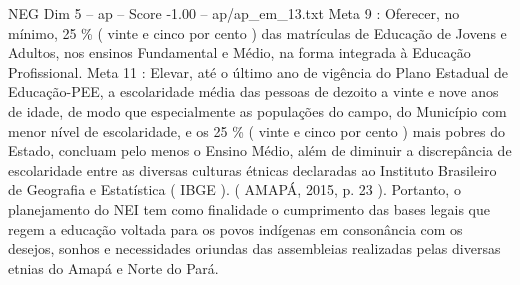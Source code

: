\begin{textsample}{NEG Dim 5 – ap – Score -1.00 – ap/ap\_em\_13.txt}
Meta 9 : Oferecer, no mínimo, 25 \% ( vinte e cinco por cento ) das matrículas de Educação de Jovens e Adultos, nos ensinos Fundamental e Médio, na forma integrada à Educação Profissional.
Meta 11 : Elevar, até o último ano de vigência do Plano Estadual de Educação-PEE, a escolaridade média das pessoas de dezoito a vinte e nove anos de idade, de modo que especialmente as populações do campo, do Município com menor nível de escolaridade, e os 25 \% ( vinte e cinco por cento ) mais pobres do Estado, concluam pelo menos o Ensino Médio, além de diminuir a discrepância de escolaridade entre as diversas culturas étnicas declaradas ao Instituto Brasileiro de Geografia e Estatística ( IBGE ). ( AMAPÁ, 2015, p. 23 ).
Portanto, o planejamento do NEI tem como finalidade o cumprimento das bases legais que regem a educação voltada para os povos indígenas em consonância com os desejos, sonhos e necessidades oriundas das assembleias realizadas pelas diversas etnias do Amapá e Norte do Pará.

\end{textsample}
